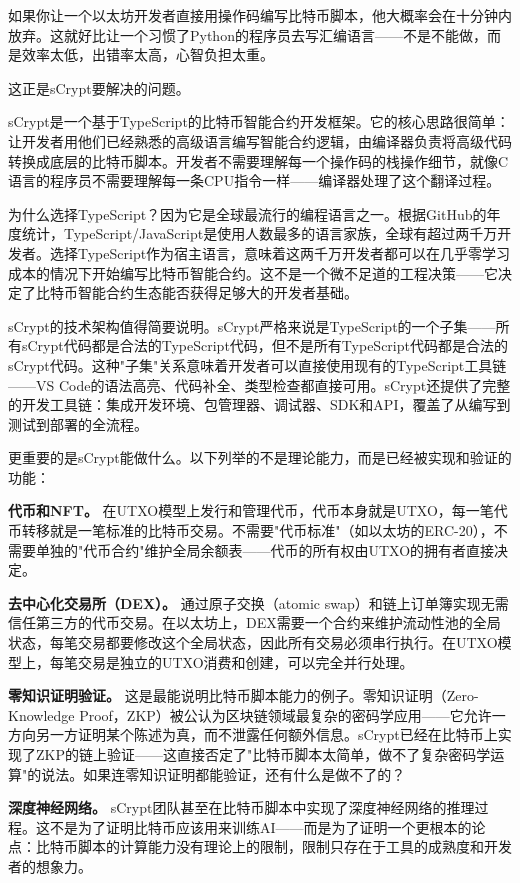 \documentclass[a4paper,12pt,openany]{ctexbook}
\begin{document}
如果你让一个以太坊开发者直接用操作码编写比特币脚本，他大概率会在十分钟内放弃。这就好比让一个习惯了Python的程序员去写汇编语言——不是不能做，而是效率太低，出错率太高，心智负担太重。

这正是sCrypt要解决的问题。

sCrypt是一个基于TypeScript的比特币智能合约开发框架。它的核心思路很简单：让开发者用他们已经熟悉的高级语言编写智能合约逻辑，由编译器负责将高级代码转换成底层的比特币脚本。开发者不需要理解每一个操作码的栈操作细节，就像C语言的程序员不需要理解每一条CPU指令一样——编译器处理了这个翻译过程。

为什么选择TypeScript？因为它是全球最流行的编程语言之一。根据GitHub的年度统计，TypeScript/JavaScript是使用人数最多的语言家族，全球有超过两千万开发者。选择TypeScript作为宿主语言，意味着这两千万开发者都可以在几乎零学习成本的情况下开始编写比特币智能合约。这不是一个微不足道的工程决策——它决定了比特币智能合约生态能否获得足够大的开发者基础。

sCrypt的技术架构值得简要说明。sCrypt严格来说是TypeScript的一个子集——所有sCrypt代码都是合法的TypeScript代码，但不是所有TypeScript代码都是合法的sCrypt代码。这种"子集"关系意味着开发者可以直接使用现有的TypeScript工具链——VS Code的语法高亮、代码补全、类型检查都直接可用。sCrypt还提供了完整的开发工具链：集成开发环境、包管理器、调试器、SDK和API，覆盖了从编写到测试到部署的全流程。

更重要的是sCrypt能做什么。以下列举的不是理论能力，而是已经被实现和验证的功能：

\textbf{代币和NFT。} 在UTXO模型上发行和管理代币，代币本身就是UTXO，每一笔代币转移就是一笔标准的比特币交易。不需要"代币标准"（如以太坊的ERC-20），不需要单独的"代币合约"维护全局余额表——代币的所有权由UTXO的拥有者直接决定。

\textbf{去中心化交易所（DEX）。} 通过原子交换（atomic swap）和链上订单簿实现无需信任第三方的代币交易。在以太坊上，DEX需要一个合约来维护流动性池的全局状态，每笔交易都要修改这个全局状态，因此所有交易必须串行执行。在UTXO模型上，每笔交易是独立的UTXO消费和创建，可以完全并行处理。

\textbf{零知识证明验证。} 这是最能说明比特币脚本能力的例子。零知识证明（Zero-Knowledge Proof，ZKP）被公认为区块链领域最复杂的密码学应用——它允许一方向另一方证明某个陈述为真，而不泄露任何额外信息。sCrypt已经在比特币上实现了ZKP的链上验证——这直接否定了"比特币脚本太简单，做不了复杂密码学运算"的说法。如果连零知识证明都能验证，还有什么是做不了的？

\textbf{深度神经网络。} sCrypt团队甚至在比特币脚本中实现了深度神经网络的推理过程。这不是为了证明比特币应该用来训练AI——而是为了证明一个更根本的论点：比特币脚本的计算能力没有理论上的限制，限制只存在于工具的成熟度和开发者的想象力。
\end{document}
